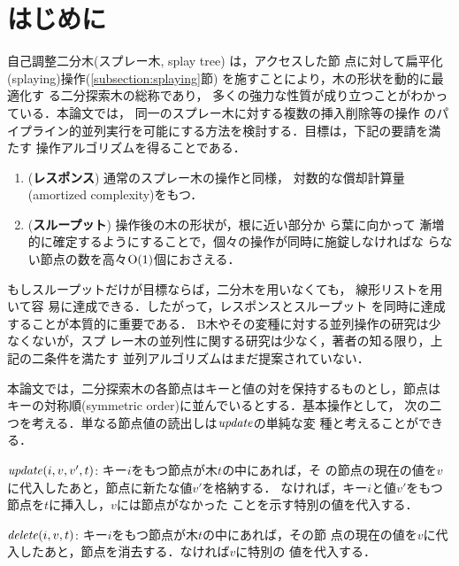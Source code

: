 \section{はじめに}

自己調整二分木(スプレー木, splay tree) \cite{ST85}は，アクセスした節
点に対して扁平化(splaying)操作(\ref{subsection:splaying}節)
を施すことにより，木の形状を動的に最適化す
る二分探索木の総称であり，
%
%
多くの強力な性質が成り立つことがわかっている．本論文では，
同一のスプレー木に対する複数の挿入削除等の操作
のパイプライン的並列実行を可能にする方法を検討する．目標は，下記の要請を満たす
操作アルゴリズムを得ることである．
%
\begin{enumerate}
\item ({\bf レスポンス}) 通常のスプレー木の操作と同様，
対数的な償却計算量(amortized complexity)\cite{T85}をもつ．

\item ({\bf スループット}) 操作後の木の形状が，根に近い部分か
ら葉に向かって
漸増的に確定するようにすることで，個々の操作が同時に施錠しなければな
らない節点の数を高々${\rm O}(1)$個におさえる．
\end{enumerate}
%
もしスループットだけが目標ならば，二分木を用いなくても，
線形リストを用いて容
易に達成できる．したがって，レスポンスとスループット
を同時に達成することが本質的に重要である．
%
B木やその変種に対する並列操作の研究は少なくない\cite{LS86}が，スプ
レー木の並列性に関する研究は少なく，著者の知る限り，上記の二条件を満たす
並列アルゴリズムはまだ提案されていない．

本論文では，二分探索木の各節点はキーと値の対を保持するものとし，節点は
キーの対称順(symmetric order)に並んでいるとする．基本操作として，
次の二つを考える．単なる節点値の読出しは${\it update\/}$の単純な変
種と考えることができる．

\begin{description}
\item{${\it update}(i,v,v',t)$:} キー$i$をもつ節点が木$t$の中にあれば，そ
の節点の現在の値を$v$に代入したあと，節点に新たな値$v'$を格納する．
なければ，キー$i$と値$v'$をもつ節点を$t$に挿入し，$v$には節点がなかった
ことを示す特別の値を代入する．

\item{${\it delete}(i,v,t)$:} キー$i$をもつ節点が木$t$の中にあれば，その節
点の現在の値を$v$に代入したあと，節点を消去する．なければ$v$に特別の
値を代入する．
\end{description}
